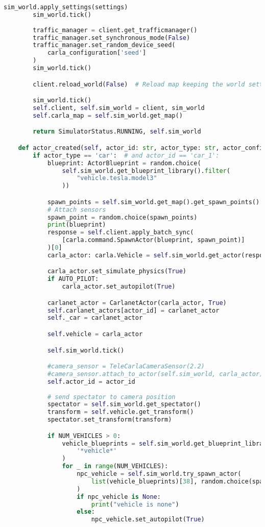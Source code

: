 \begin{lstlisting}[language=Python, caption={Simple data collection example, now using network simulation capabilities.},label={code:network}]
        sim_world.apply_settings(settings)
        sim_world.tick()
        
        traffic_manager = client.get_trafficmanager()
        traffic_manager.set_synchronous_mode(False)
        traffic_manager.set_random_device_seed(
            carla_configuration['seed']
        )
        sim_world.tick()

        client.reload_world(False)  # Reload map keeping the world settings

        sim_world.tick()
        self.client, self.sim_world = client, sim_world
        self.carla_map = self.sim_world.get_map()

        return SimulatorStatus.RUNNING, self.sim_world

    def actor_created(self, actor_id: str, actor_type: str, actor_config) -> CarlanetActor:
        if actor_type == 'car':  # and actor_id == 'car_1':
            blueprint: ActorBlueprint = random.choice(
                self.sim_world.get_blueprint_library().filter(
                    "vehicle.tesla.model3"
                ))

            spawn_points = self.sim_world.get_map().get_spawn_points()
            # Attach sensors
            spawn_point = random.choice(spawn_points)
            print(blueprint)
            response = self.client.apply_batch_sync(
                [carla.command.SpawnActor(blueprint, spawn_point)]
            )[0]
            carla_actor: carla.Vehicle = self.sim_world.get_actor(response.actor_id)

            carla_actor.set_simulate_physics(True)
            if AUTO_PILOT:
                carla_actor.set_autopilot(True)

            carlanet_actor = CarlanetActor(carla_actor, True)
            self.carlanet_actors[actor_id] = carlanet_actor
            self._car = carlanet_actor

            self.vehicle = carla_actor

            self.sim_world.tick()

            #camera_sensor = TeleCarlaCameraSensor(2.2)
            #camera_sensor.attach_to_actor(self.sim_world, carla_actor)
            self.actor_id = actor_id
            
            # send spectator to camera position
            spectator = self.sim_world.get_spectator()
            transform = self.vehicle.get_transform()
            spectator.set_transform(transform)

            if NUM_VEHICLES > 0:
                vehicle_blueprints = self.sim_world.get_blueprint_library().filter(
                    '*vehicle*'
                )
                for _ in range(NUM_VEHICLES):
                    npc_vehicle = self.sim_world.try_spawn_actor(
                        list(vehicle_blueprints)[38], random.choice(spawn_points)
                    )
                    if npc_vehicle is None:
                        print("vehicle is none")
                    else:
                        npc_vehicle.set_autopilot(True)


\end{lstlisting}
